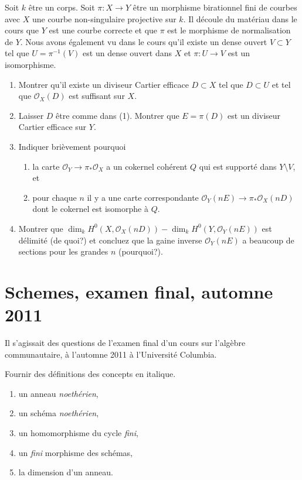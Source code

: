 \begin{exercise}
\label{exercise-birational-morphism-curves-ample}
Soit $k$ être un corps. Soit $\pi : X \to Y$ être un
morphisme birationnel fini de courbes avec $X$ une courbe non-singulaire projective sur $k$.
Il découle du matériau dans le cours que $Y$ est une courbe correcte et que
$\pi$ est le morphisme de normalisation de $Y$. Nous avons
également vu dans le cours qu'il existe un dense ouvert $V \subset Y$ tel que
$U = \pi^{-1}(V)$ est un dense ouvert dans $X$ et $\pi : U \to
V$ est un isomorphisme.
\begin{enumerate}
\item Montrer qu'il existe un diviseur Cartier efficace $D \subset X$ tel
que $D \subset U$ et tel que $\mathcal{O}_X(D)$ est suffisant sur $X$.
\item Laisser $D$ être comme dans (1). Montrer que $E = \pi(D)$ est un diviseur Cartier
efficace sur $Y$.
\item Indiquer brièvement pourquoi
\begin{enumerate}
\item la carte $\mathcal{O}_Y \to \pi_*\mathcal{O}_X$ a un cokernel cohérent $Q$ qui
est supporté dans $Y \setminus V$, et
\item pour chaque $n$ il y a
une carte correspondante $\mathcal{O}_Y(nE) \to \pi_*\mathcal{O}_X(nD)$ dont
le cokernel est isomorphe à $Q$.
\end{enumerate}
\item Montrer
que $\dim_k H^0(X, \mathcal{O}_X(nD)) - \dim_k H^0(Y, \mathcal{O}_Y(nE))$ est délimité
(de quoi?) et concluez que la gaine inverse $\mathcal{O}_Y(nE)$
a beaucoup de sections pour les grandes $n$ (pourquoi?).
\end{enumerate}
\end{exercise}





\section{Schemes, examen final, automne 2011}
\label{section-final-exam-fall-2011}

\noindent
Il s'agissait des questions de l'examen final d'un
cours sur l'algèbre communautaire, à l'automne 2011 à l'Université Columbia.


\begin{exercise}[Definitions]
\label{exercise-definitions-fall-2011}
Fournir des définitions des concepts en italique.
\begin{enumerate}
\item un anneau {\it noethérien},
\item un schéma {\it noethérien},
\item un homomorphisme du cycle {\it fini},
\item un {\it fini} morphisme des schémas,
\item la dimension {\it} d'un anneau.
\end{enumerate}
\end{exercise}

